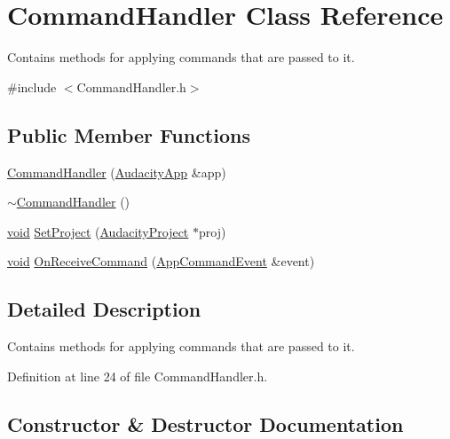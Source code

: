 \hypertarget{class_command_handler}{}\section{Command\+Handler Class Reference}
\label{class_command_handler}


Contains methods for applying commands that are passed to it.  




{\ttfamily \#include $<$Command\+Handler.\+h$>$}

\subsection*{Public Member Functions}
\begin{DoxyCompactItemize}
\item 
\hyperlink{class_command_handler_abf2128fdc4c028c603929c7e899f2edd}{Command\+Handler} (\hyperlink{class_audacity_app}{Audacity\+App} \&app)
\item 
\hyperlink{class_command_handler_a774109b82ae7c2556d781f457f3974c7}{$\sim$\+Command\+Handler} ()
\item 
\hyperlink{sound_8c_ae35f5844602719cf66324f4de2a658b3}{void} \hyperlink{class_command_handler_a4e27f4a3dbdc972b732565db8c45beb6}{Set\+Project} (\hyperlink{class_audacity_project}{Audacity\+Project} $\ast$proj)
\item 
\hyperlink{sound_8c_ae35f5844602719cf66324f4de2a658b3}{void} \hyperlink{class_command_handler_a59c4865ad84d0034c6c1e693e4948341}{On\+Receive\+Command} (\hyperlink{class_app_command_event}{App\+Command\+Event} \&event)
\end{DoxyCompactItemize}


\subsection{Detailed Description}
Contains methods for applying commands that are passed to it. 

Definition at line 24 of file Command\+Handler.\+h.



\subsection{Constructor \& Destructor Documentation}
